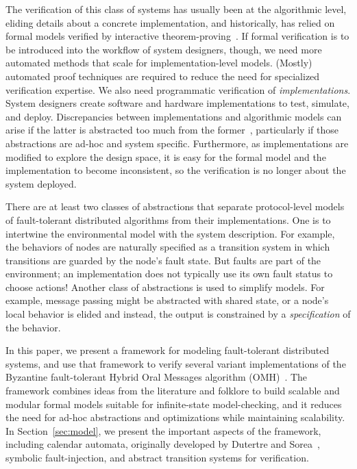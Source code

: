 \documentclass{llncs/llncs}
\newcommand{\OMH}{\ensuremath{\mathrm{OMH}}\xspace}
\begin{document}
The verification of this class of systems has usually been at the algorithmic level, eliding details about a concrete implementation, and historically, has relied on formal models verified by interactive theorem-proving~\cite{om-acl2-impl,Young97:IC,Lincoln-Rushby,pvs}. If formal verification is to be introduced into the workflow of system designers, though, we need more automated methods that scale for implementation-level models. (Mostly) automated proof techniques are required to reduce the need for specialized verification expertise. We also need programmatic verification of \emph{implementations}. System designers create software and hardware implementations to test, simulate, and deploy. Discrepancies between implementations and algorithmic models can arise if the latter is abstracted too much from the former~\cite{paxos}, particularly if those abstractions are ad-hoc and system specific. Furthermore, as implementations are modified to explore the design space, it is easy for the formal model and the implementation to become inconsistent, so the verification is no longer about the system deployed.

There are at least two classes of abstractions that separate protocol-level models of fault-tolerant distributed algorithms from their implementations.  One is to intertwine the environmental model with the system description. For example, the behaviors of nodes are naturally specified as a transition system in which transitions are guarded by the node's fault state. But faults are part of the environment; an implementation does not typically use its own fault status to choose actions! Another class of abstractions is used to simplify models.  For example, message passing might be abstracted with shared state, or a node's local behavior is elided and instead, the output is constrained by a \emph{specification} of the behavior.

In this paper, we present a framework for modeling fault-tolerant distributed systems, and use that framework to verify several variant implementations of the Byzantine fault-tolerant Hybrid Oral Messages algorithm (\OMH)~\cite{Lincoln-Rushby}. The framework combines ideas from the literature and folklore to build scalable and modular formal models suitable for infinite-state model-checking, and it reduces the need for ad-hoc abstractions and optimizations while maintaining scalability. In Section~\ref{sec:model}, we present the important aspects of the framework, including calendar automata, originally developed by Dutertre and Sorea~\cite{cal}, symbolic fault-injection, and abstract transition systems for verification.
\end{document}

